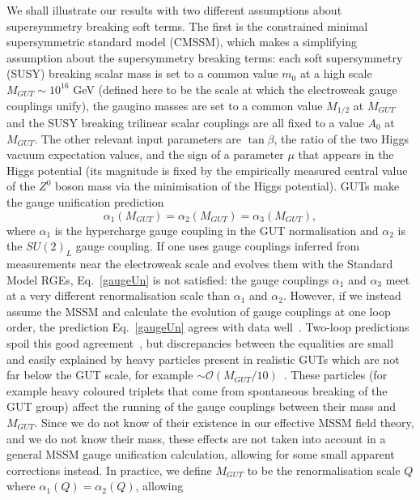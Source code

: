 \documentclass[final,3p,times,pdflatex]{elsarticle}
\begin{document}
We shall illustrate our results with two different assumptions about
supersymmetry breaking soft terms. The first is the
constrained minimal supersymmetric standard model (CMSSM), which makes a
simplifying 
assumption about the supersymmetry breaking terms: each soft supersymmetry
(SUSY) breaking
scalar mass is set to a common value $m_0$ at a high scale $M_{GUT}\sim
10^{16}$ GeV (defined
here to be the scale at which the electroweak gauge couplings unify), the
gaugino masses are set to a common value $M_{1/2}$ at $M_{GUT}$ and the 
SUSY breaking trilinear scalar couplings are all fixed to a value $A_0$ at
$M_{GUT}$. The other relevant input parameters are $\tan \beta$, the ratio of the
two Higgs vacuum expectation values, and the sign of a parameter $\mu$ that
appears in the Higgs potential (its magnitude is fixed by the empirically
measured central value of 
the $Z^0$ boson mass via the minimisation of 
the 
Higgs potential). GUTs make the gauge unification prediction 
\begin{equation}
\alpha_1(M_{GUT})=\alpha_2(M_{GUT})=\alpha_3(M_{GUT}),  \label{gaugeUn}
\end{equation}
where $\alpha_1$ is the hypercharge gauge coupling in the GUT normalisation
and
$\alpha_2$ is the $SU(2)_L$ gauge coupling. 
If one uses gauge couplings inferred from measurements near the electroweak
scale 
and 
evolves them with the Standard Model RGEs, Eq.~\ref{gaugeUn} is not satisfied:
the gauge couplings $\alpha_1$ and $\alpha_3$ meet at a very different
renormalisation scale than $\alpha_1$ and $\alpha_2$. However, if we instead
assume the MSSM and calculate the evolution of gauge couplings at one loop
order, the prediction Eq.~\ref{gaugeUn} agrees with data
well~\cite{Amaldi:1987fu}. Two-loop 
predictions spoil this good agreement~\cite{Shifman:1994py}, but discrepancies
between the 
equalities are small and easily explained by heavy particles present in
realistic GUTs which
are not far below the GUT scale, for example $\sim \mathcal
O(M_{GUT}/10)$~\cite{Hall:1995eq}.  
These particles (for example heavy coloured triplets that come from
spontaneous breaking of the GUT group) affect the running of the gauge
couplings between their mass and $M_{GUT}$. Since we do not know of their
existence in our effective MSSM field theory, and we do not know their mass,
these effects are not taken into account in a general MSSM gauge unification
calculation, allowing for some small apparent corrections instead.
In practice, we define $M_{GUT}$
to be the renormalisation scale $Q$ where $\alpha_1(Q)=\alpha_2(Q)$, allowing
\end{document}
